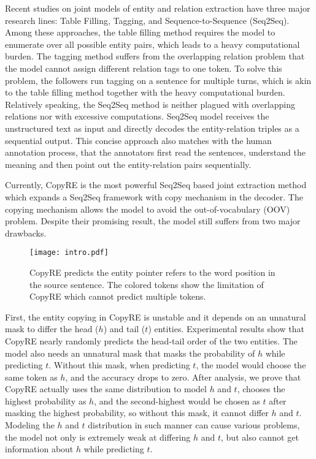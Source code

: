 \documentclass[letterpaper]{article} \usepackage{aaai20}  \usepackage{times}  \usepackage{helvet} \usepackage{courier}  \usepackage[hyphens]{url}  \usepackage{graphicx}
\begin{document}
  Recent studies on joint models of entity and relation extraction have three major research lines: Table Filling, Tagging, and Sequence-to-Sequence (Seq2Seq). Among these approaches, the table filling method \cite{table_filling,crf_norm} requires the model to enumerate over all possible entity pairs, which leads to a heavy computational burden. 
The tagging method \cite{novel_tagging} suffers from the overlapping relation problem that the model cannot assign different relation tags to one token. To solve this problem, the followers \cite{rlre,tag2table} run tagging on a sentence for multiple turns, which is akin to the table filling method together with the heavy computational burden. 
Relatively speaking, the Seq2Seq method is neither plagued with overlapping relations nor with excessive computations.
  Seq2Seq model receives the unstructured text as input and directly decodes the entity-relation triples as a sequential output. 
This concise approach also matches with the human annotation process, that the annotators first read the sentences, understand the meaning and then point out the entity-relation pairs sequentially.
  
   Currently, CopyRE \cite{CopyRE} is the most powerful Seq2Seq based joint extraction method which expands a Seq2Seq framework with copy mechanism in the decoder. The copying mechanism allows the model to avoid the out-of-vocabulary (OOV) problem. Despite their promising result, the model still suffers from two major drawbacks. 
\begin{figure}[t]
  \centering
  \texttt{[image: intro.pdf]}
  \caption{CopyRE predicts the entity pointer refers to the word position in the source sentence. The colored tokens show the limitation of CopyRE which cannot predict multiple tokens.}
  \label{intro}
  \end{figure}


First, the entity copying in CopyRE is unstable and it depends on an unnatural mask to differ the head ($h$) and tail ($t$) entities. Experimental results show that CopyRE nearly randomly predicts the head-tail order of the two entities. The model also needs an unnatural mask that masks the probability of $h$ while predicting $t$. Without this mask, when predicting $t$, the model would choose the same token as $h$, and the accuracy drops to zero. 
After analysis, we prove that CopyRE actually uses the same distribution to model $h$ and $t$, chooses the highest probability as $h$, and the second-highest would be chosen as $t$ after masking the highest probability, so without this mask, it cannot differ $h$ and $t$. Modeling the $h$ and $t$ distribution in such manner can cause various problems, the model not only is extremely weak at differing $h$ and $t$, but also cannot get information about $h$ while predicting $t$.
  
\end{document}
